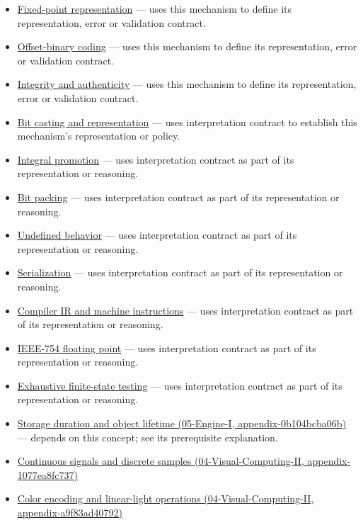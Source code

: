 \begin{itemize}
\tightlist
\item
  \hyperref[appendix-1d0dbe8924cc]{Fixed-point representation} --- uses this mechanism to define its representation, error or validation contract.
\item
  \hyperref[appendix-53a8cfb25f8d]{Offset-binary coding} --- uses this mechanism to define its representation, error or validation contract.
\item
  \hyperref[appendix-cbe594d1ab0a]{Integrity and authenticity} --- uses this mechanism to define its representation, error or validation contract.
\item
  \hyperref[appendix-34ee45f161c1]{Bit casting and representation} --- uses interpretation contract to establish this mechanism's representation or policy.
\item
  \hyperref[appendix-45303d03796a]{Integral promotion} --- uses interpretation contract as part of its representation or reasoning.
\item
  \hyperref[appendix-1f9963e1a5d1]{Bit packing} --- uses interpretation contract as part of its representation or reasoning.
\item
  \hyperref[appendix-f558f5b4d8f2]{Undefined behavior} --- uses interpretation contract as part of its representation or reasoning.
\item
  \hyperref[appendix-91d09ebed979]{Serialization} --- uses interpretation contract as part of its representation or reasoning.
\item
  \hyperref[appendix-942ad41afb30]{Compiler IR and machine instructions} --- uses interpretation contract as part of its representation or reasoning.
\item
  \hyperref[appendix-343615f49ddf]{IEEE-754 floating point} --- uses interpretation contract as part of its representation or reasoning.
\item
  \hyperref[appendix-05db24ccc28a]{Exhaustive finite-state testing} --- uses interpretation contract as part of its representation or reasoning.
\item
  \href{../05-Engine-I/main.pdf\#nameddest=appendix-0b104bcba06b}{Storage duration and object lifetime (05-Engine-I, appendix-0b104bcba06b)} --- depends on this concept; see its prerequisite explanation.
\item
  \href{../04-Visual-Computing-II/main.pdf\#nameddest=appendix-1077ea8fc737}{Continuous signals and discrete samples (04-Visual-Computing-II, appendix-1077ea8fc737)}
\item
  \href{../04-Visual-Computing-II/main.pdf\#nameddest=appendix-a9f83ad40792}{Color encoding and linear-light operations (04-Visual-Computing-II, appendix-a9f83ad40792)}
\end{itemize}

